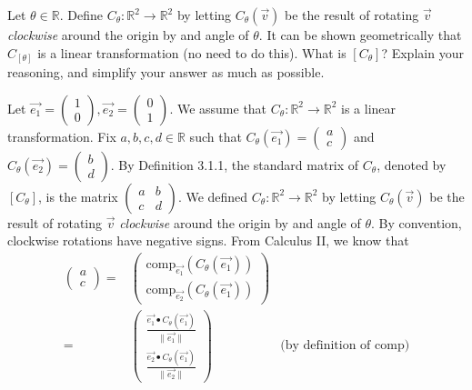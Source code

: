 \documentclass[12pt]{article}
\newenvironment{problem}[2][Problem]
{
	\begin{trivlist} 
		\item[\hskip \labelsep {\bfseries #1 #2:}]
	}
{
	\end{trivlist}
	}
\newenvironment{solution}[1][Solution]
{
	\begin{trivlist} 
		\item[\hskip \labelsep {\itshape #1:}]
	}
	{
	\end{trivlist}
}
\begin{document}
\newpage
\begin{problem}{3}
Let $\theta \in \mathbb{R}$. Define $C_{\theta} : \mathbb{R}^2 \to \mathbb{R}^2$ by letting $C_{\theta}(\vec{v})$ be the result of rotating $\vec{v}$ {\it clockwise} around the origin by and angle of $\theta$. It can be shown geometrically that $C_[\theta]$ is a linear transformation (no need to do this). What is $[C_{\theta}]$? Explain your reasoning, and simplify your answer as much as possible.
\noindent
\newline
\newline
\begin{solution}
Let $\vec{e_{1}}=\begin{pmatrix} 1\\0\end{pmatrix},\vec{e_{2}}=\begin{pmatrix} 0\\1\end{pmatrix}$. We assume that $C_{\theta} : \mathbb{R}^2 \to \mathbb{R}^2$ is a linear transformation. Fix $a,b,c,d \in \mathbb{R}$ such that $C_{\theta}(\vec{e_{1}})=\begin{pmatrix}a\\c\end{pmatrix}$ and $C_{\theta}(\vec{e_{2}})=\begin{pmatrix}b\\d\end{pmatrix}$. By Definition 3.1.1, the standard matrix of $C_{\theta}$, denoted by $[C_{\theta}]$, is the matrix $\begin{pmatrix} a &b \\c&d\end{pmatrix}$. We defined $C_{\theta} : \mathbb{R}^2 \to \mathbb{R}^2$ by letting $C_{\theta}(\vec{v})$ be the result of rotating $\vec{v}$ {\it clockwise} around the origin by and angle of $\theta$. By convention, clockwise rotations have negative signs. From Calculus II, we know that
\begin{align*}
\begin{pmatrix}a\\c\end{pmatrix} =&\begin{pmatrix}\text{comp}_{\vec{e_{1}}}(C_{\theta}(\vec{e_{1}}))\\ \text{comp}_{\vec{e_{2}}}(C_{\theta}(\vec{e_{1}})) \end{pmatrix} &\\
=&\begin{pmatrix} \frac{\vec{e_{1}} \bullet C_{\theta}(\vec{e_{1}})}{\| \vec{e_{1}} \|} \\ \frac{\vec{e_{2}} \bullet C_{\theta}(\vec{e_{1}})}{\| \vec{e_{2}} \|} \end{pmatrix} &\text{(by definition of comp)} \\

\end{align*}
\end{solution}
\end{problem}
\end{document}
